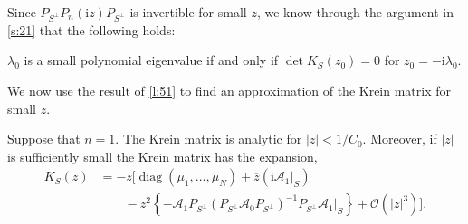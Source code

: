 \documentclass[review,onefignum,onetabnum]{siamart171218}
\def\det{\mathop\mathrm{det}\nolimits}
\def\diag{\mathop\mathrm{diag}\nolimits}
\newcommand{\rmi}{\mathrm{i}}
\newcommand{\calA}{\mathcal{A}}
\newcommand{\calO}{\mathcal{O}}
\newcommand{\vK}{\bm{\mathit{K}}}
\newcommand{\vx}{\bm{\mathit{x}}}
\newcommand{\vn}{\bm{\mathit{0}}}
\begin{document}
Since $P_{S^\perp}P_n(\rmi z)P_{S^\perp}$ is invertible for small $z$, we know through the argument in \cref{s:21} that the following holds:

\begin{corollary}\label{cor:51}
$\lambda_0$ is a small polynomial eigenvalue if and only if $\det\vK_S(z_0)=0$ for $z_0=-\rmi\lambda_0$.
\end{corollary}


We now use the result of \cref{l:51} to find an approximation of the Krein matrix for small $z$.

\begin{lemma}\label{l:52}
Suppose that $n=1$. The Krein matrix is analytic for $|z|<1/C_0$. Moreover, if $|z|$ is sufficiently small the Krein matrix has the expansion,
\begin{equation}\label{KSz}
\begin{aligned}
\vK_S(z)&=-z\Big[\diag(\mu_1,\dots,\mu_N)+\overline{z}\left(\rmi\calA_1|_S\right)\\
&\qquad-
\overline{z}^2\left\{-
\calA_1P_{S^\perp}\left(P_{S^\perp}\calA_0P_{S^\perp}\right)^{-1}P_{S^\perp}\calA_1|_S\right\}
+\calO(|z|^3)\Big].
\end{aligned}
\end{equation}
\end{lemma}
\end{document}
